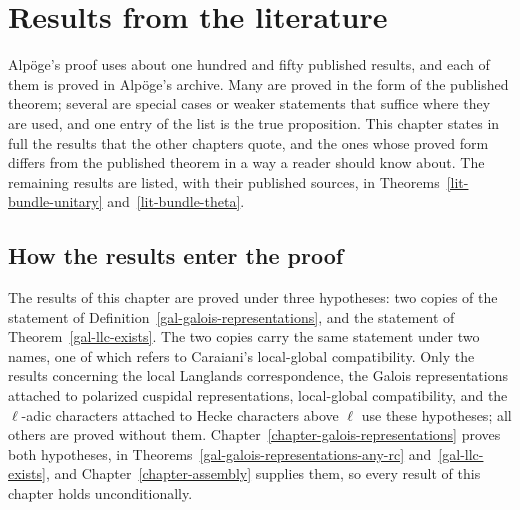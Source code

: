 \chapter{Results from the literature}\label{chapter-literature}
Alpöge's proof uses about one hundred and fifty published results, and each
of them is proved in Alpöge's archive. Many are proved in the form of the
published theorem; several are special cases or weaker statements that
suffice where they are used, and one entry of the list is the true
proposition. This chapter states in full the results that the other chapters
quote, and the ones whose proved form differs from the published theorem in a
way a reader should know about. The remaining results are listed, with their
published sources, in Theorems~\ref{lit-bundle-unitary}
and~\ref{lit-bundle-theta}.

\section{How the results enter the proof}\label{section-lit-inputs}

\begin{remark}\label{lit-open-inputs}
The results of this chapter are proved under three hypotheses: two copies of
the statement of Definition~\ref{gal-galois-representations}, and the statement
of Theorem~\ref{gal-llc-exists}. The two copies carry the same statement under
two names, one of which refers to Caraiani's local-global compatibility.
Only the results concerning the local Langlands correspondence, the Galois
representations attached to polarized cuspidal representations, local-global
compatibility, and the $\ell$-adic characters attached to Hecke characters
above $\ell$ use these hypotheses; all others are proved without them.
Chapter~\ref{chapter-galois-representations} proves both hypotheses, in
Theorems~\ref{gal-galois-representations-any-rc} and~\ref{gal-llc-exists},
and Chapter~\ref{chapter-assembly} supplies them, so every result of this
chapter holds unconditionally.
\end{remark}

